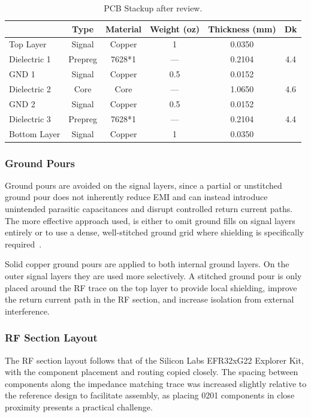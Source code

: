 \begin{table}[H]
\centering
\caption{PCB Stackup after review.}
\label{tab:PCBStackup}
\begin{tabular}{@{}lcccSS@{}}
\toprule
                    & {Type}  & {Material}    & {Weight (oz)} & {Thickness (mm)} & {Dk} \\
\midrule
Top Layer           & Signal  & Copper        & 1             & 0.0350           &         \\ 
\midrule
Dielectric 1        & Prepreg & 7628*1        & ---           & 0.2104           & 4.4     \\ 
\midrule
GND 1               & Signal  & Copper        & 0.5           & 0.0152           &         \\ 
\midrule
Dielectric 2        & Core    & Core          & ---           & 1.0650           & 4.6     \\ 
\midrule
GND 2               & Signal  & Copper        & 0.5           & 0.0152           &         \\
\midrule
Dielectric 3        & Prepreg & 7628*1        & ---           & 0.2104           & 4.4     \\ 
\midrule
Bottom Layer        & Signal  & Copper        & 1             & 0.0350           &         \\ 
\bottomrule
\end{tabular}
\end{table}

\subsubsection{Ground Pours} 
Ground pours are avoided on the signal layers, since a partial or unstitched ground pour does not inherently reduce EMI and can instead introduce unintended parasitic capacitances and disrupt controlled return current paths. The more effective approach used, is either to omit ground fills on signal layers entirely or to use a dense, well-stitched ground grid where shielding is specifically required~\cite{bogatin_unlearn_pcb}.

Solid copper ground pours are applied to both internal ground layers. On the outer signal layers they are used more selectively. A stitched ground pour is only placed around the RF trace on the top layer to provide local shielding, improve the return current path in the RF section, and increase isolation from external interference.

\subsubsection{RF Section Layout} \label{sec:rf_layout}
The RF section layout follows that of the Silicon Labs EFR32xG22 Explorer Kit, with the component placement and routing copied closely. The spacing between components along the impedance matching trace was increased slightly relative to the reference design to facilitate assembly, as placing 0201 components in close proximity presents a practical challenge.
 
